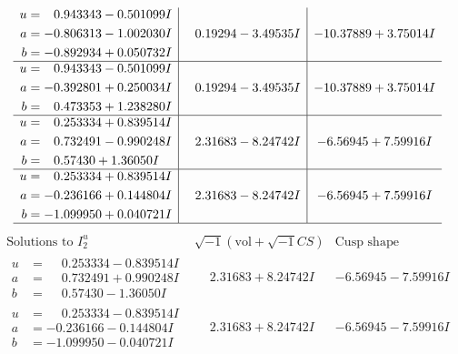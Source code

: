 \documentclass[1p]{elsarticle_modified}
\theoremstyle{definition}
\newcommand{\I}{\sqrt{-1}}
\begin{document}
$$\begin{array}{c|c|c}
\begin{aligned}
u &= \phantom{-}0.943343 - 0.501099 I \\
a &= -0.806313 - 1.002030 I \\
b &= -0.892934 + 0.050732 I\end{aligned}
 & \phantom{-}0.19294 - 3.49535 I & -10.37889 + 3.75014 I \\ \hline\begin{aligned}
u &= \phantom{-}0.943343 - 0.501099 I \\
a &= -0.392801 + 0.250034 I \\
b &= \phantom{-}0.473353 + 1.238280 I\end{aligned}
 & \phantom{-}0.19294 - 3.49535 I & -10.37889 + 3.75014 I \\ \hline\begin{aligned}
u &= \phantom{-}0.253334 + 0.839514 I \\
a &= \phantom{-}0.732491 - 0.990248 I \\
b &= \phantom{-}0.57430 + 1.36050 I\end{aligned}
 & \phantom{-}2.31683 - 8.24742 I & -6.56945 + 7.59916 I \\ \hline\begin{aligned}
u &= \phantom{-}0.253334 + 0.839514 I \\
a &= -0.236166 + 0.144804 I \\
b &= -1.099950 + 0.040721 I\end{aligned}
 & \phantom{-}2.31683 - 8.24742 I & -6.56945 + 7.59916 I\\
 \hline 
 \end{array}$$\newpage$$\begin{array}{c|c|c}  
\text{Solutions to }I^u_{2}& \I (\text{vol} + \sqrt{-1}CS) & \text{Cusp shape}\\
 \hline 
\begin{aligned}
u &= \phantom{-}0.253334 - 0.839514 I \\
a &= \phantom{-}0.732491 + 0.990248 I \\
b &= \phantom{-}0.57430 - 1.36050 I\end{aligned}
 & \phantom{-}2.31683 + 8.24742 I & -6.56945 - 7.59916 I \\ \hline\begin{aligned}
u &= \phantom{-}0.253334 - 0.839514 I \\
a &= -0.236166 - 0.144804 I \\
b &= -1.099950 - 0.040721 I\end{aligned}
 & \phantom{-}2.31683 + 8.24742 I & -6.56945 - 7.59916 I \\ \hline\begin{aligned}

\end{aligned}
\end{array}$$
\end{document}
